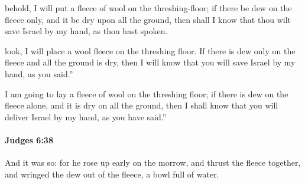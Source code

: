 			\begin{versebox}
					\item[BHS] 
					\item[ASV] behold, I will put a fleece of wool on the threshing-floor; if there be dew on the fleece only, and it be dry upon all the ground, then shall I know that thou wilt save Israel by my hand, as thou hast spoken.
					\item[NIV] look, I will place a wool fleece on the threshing floor. If there is dew only on the fleece and all the ground is dry, then I will know that you will save Israel by my hand, as you said.”
					\item[NRSV] I am going to lay a fleece of wool on the threshing floor; if there is dew on the fleece alone, and it is dry on all the ground, then I shall know that you will deliver Israel by my hand, as you have said.”
			\end{versebox}

		\paragraph{Judges 6:38} %
			\label{JUDGES-6-38}

			And it was so: for he rose up early on the morrow, and thrust the fleece together, and wringed the dew out of the fleece, a bowl full of water.

